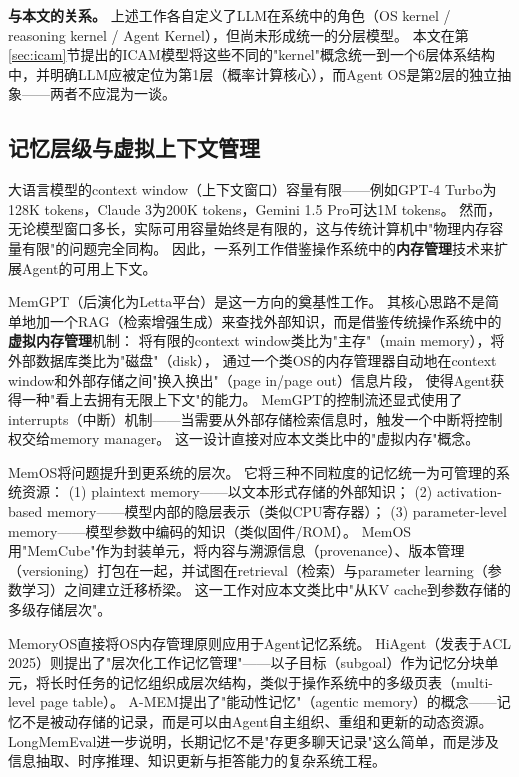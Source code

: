 \textbf{与本文的关系。}
上述工作各自定义了LLM在系统中的角色（OS kernel / reasoning kernel / Agent Kernel），但尚未形成统一的分层模型。
本文在第\ref{sec:icam}节提出的ICAM模型将这些不同的"kernel"概念统一到一个6层体系结构中，并明确LLM应被定位为第1层（概率计算核心），而Agent OS是第2层的独立抽象——两者不应混为一谈。

\subsection{记忆层级与虚拟上下文管理}
\label{sec:related-memory}

大语言模型的context window（上下文窗口）容量有限——例如GPT-4 Turbo为128K tokens，Claude 3为200K tokens，Gemini 1.5 Pro可达1M tokens\cite{gemini2024}。
然而，无论模型窗口多长，实际可用容量始终是有限的，这与传统计算机中"物理内存容量有限"的问题完全同构。
因此，一系列工作借鉴操作系统中的\textbf{内存管理}技术来扩展Agent的可用上下文。

MemGPT\cite{memgpt2023}（后演化为Letta平台）是这一方向的奠基性工作。
其核心思路不是简单地加一个RAG（检索增强生成）\cite{lewis2020rag}来查找外部知识，而是借鉴传统操作系统中的\textbf{虚拟内存管理}机制：
将有限的context window类比为"主存"（main memory），将外部数据库类比为"磁盘"（disk），
通过一个类OS的内存管理器自动地在context window和外部存储之间"换入换出"（page in/page out）信息片段，
使得Agent获得一种"看上去拥有无限上下文"的能力。
MemGPT的控制流还显式使用了interrupts（中断）机制——当需要从外部存储检索信息时，触发一个中断将控制权交给memory manager。
这一设计直接对应本文类比中的"虚拟内存"概念。

MemOS\cite{memos2025}将问题提升到更系统的层次。
它将三种不同粒度的记忆统一为可管理的系统资源：
(1) plaintext memory——以文本形式存储的外部知识；
(2) activation-based memory——模型内部的隐层表示（类似CPU寄存器）；
(3) parameter-level memory——模型参数中编码的知识（类似固件/ROM）。
MemOS用"MemCube"作为封装单元，将内容与溯源信息（provenance）、版本管理（versioning）打包在一起，并试图在retrieval（检索）与parameter learning（参数学习）之间建立迁移桥梁。
这一工作对应本文类比中"从KV cache到参数存储的多级存储层次"。

MemoryOS\cite{memoryos2025}直接将OS内存管理原则应用于Agent记忆系统。
HiAgent\cite{hiagent2024}（发表于ACL 2025）则提出了"层次化工作记忆管理"——以子目标（subgoal）作为记忆分块单元，将长时任务的记忆组织成层次结构，类似于操作系统中的多级页表（multi-level page table）。
A-MEM\cite{amem2025}提出了"能动性记忆"（agentic memory）的概念——记忆不是被动存储的记录，而是可以由Agent自主组织、重组和更新的动态资源。
LongMemEval\cite{longmemeval2024}进一步说明，长期记忆不是"存更多聊天记录"这么简单，而是涉及信息抽取、时序推理、知识更新与拒答能力的复杂系统工程。

